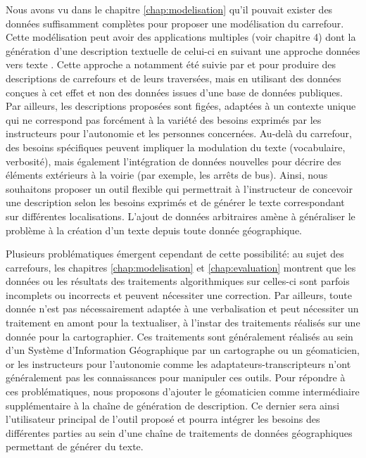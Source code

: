 \label{sec:description_geodata_to_text}

Nous avons vu dans le chapitre \ref{chap:modelisation} qu’il pouvait exister des données suffisamment complètes pour proposer une modélisation du carrefour. Cette modélisation peut avoir des applications multiples (voir chapitre 4) dont la génération d’une description textuelle de celui-ci en suivant une approche données vers texte \citep{reiter-2007-architecture}. Cette approche a notamment été suivie par \citet{Guth2019} et \citet{balata2018} pour produire des descriptions de carrefours et de leurs traversées, mais en utilisant des données conçues à cet effet et non des données issues d’une base de données publiques. Par ailleurs, les descriptions proposées sont figées, adaptées à un contexte unique qui ne correspond pas forcément à la variété des besoins exprimés par les instructeurs pour l’autonomie et les personnes concernées. Au-delà du carrefour, des besoins spécifiques peuvent impliquer la modulation du texte (vocabulaire, verbosité), mais également l’intégration de données nouvelles pour décrire des éléments extérieurs à la voirie (par exemple, les arrêts de bus). Ainsi, nous souhaitons proposer un outil flexible qui permettrait à l’instructeur de concevoir une description selon les besoins exprimés et de générer le texte correspondant sur différentes localisations. L’ajout de données arbitraires amène à généraliser le problème à la création d’un texte depuis toute donnée géographique.

\newpar{}

Plusieurs problématiques émergent cependant de cette possibilité: au sujet des carrefours, les chapitres \ref{chap:modelisation} et \ref{chap:evaluation} montrent que les données ou les résultats des traitements algorithmiques sur celles-ci sont parfois incomplets ou incorrects et peuvent nécessiter une correction. Par ailleurs, toute donnée n’est pas nécessairement adaptée à une verbalisation et peut nécessiter un traitement en amont pour la textualiser, à l’instar des traitements réalisés sur une donnée pour la cartographier. Ces traitements sont généralement réalisés au sein d’un Système d’Information Géographique par un cartographe ou un géomaticien, or les instructeurs pour l’autonomie comme les adaptateurs-transcripteurs n’ont généralement pas les connaissances pour manipuler ces outils. Pour répondre à ces problématiques, nous proposons d’ajouter le géomaticien comme intermédiaire supplémentaire à la chaîne de génération de description. Ce dernier sera ainsi l’utilisateur principal de l’outil proposé et pourra intégrer les besoins des différentes parties au sein d’une chaîne de traitements de données géographiques permettant de générer du texte.

